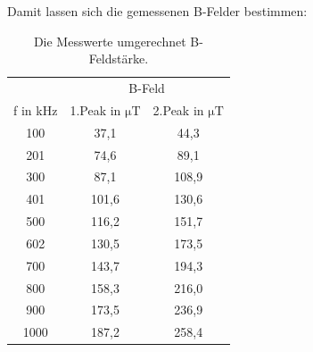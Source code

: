 \documentclass[
  bibliography=totoc,     %
  captions=tableheading,  %
  titlepage=firstiscover, %
]{scrartcl}
\begin{document}
Damit lassen sich die gemessenen B-Felder bestimmen:
\begin{table}[H]
  \centering
  \caption{Die Messwerte umgerechnet B-Feldstärke.}
  \label{tab:3}
  \begin{tabular}{c c c}
    \toprule
     & \multicolumn{2}{c}{B-Feld}\\
    f in \si{\kilo\hertz} & 1.Peak in $\si{\micro\tesla}$ & 2.Peak in $\si{\micro\tesla}$ \\
    \midrule
    100  &  37,1 &  44,3 \\
    201  &  74,6 &  89,1 \\
    300  &  87,1 & 108,9 \\
    401  & 101,6 & 130,6 \\
    500  & 116,2 & 151,7 \\
    602  & 130,5 & 173,5 \\
    700  & 143,7 & 194,3 \\
    800  & 158,3 & 216,0 \\
    900  & 173,5 & 236,9 \\
    1000 & 187,2 & 258,4 \\
    \bottomrule
  \end{tabular}
\end{table}
\end{document}
